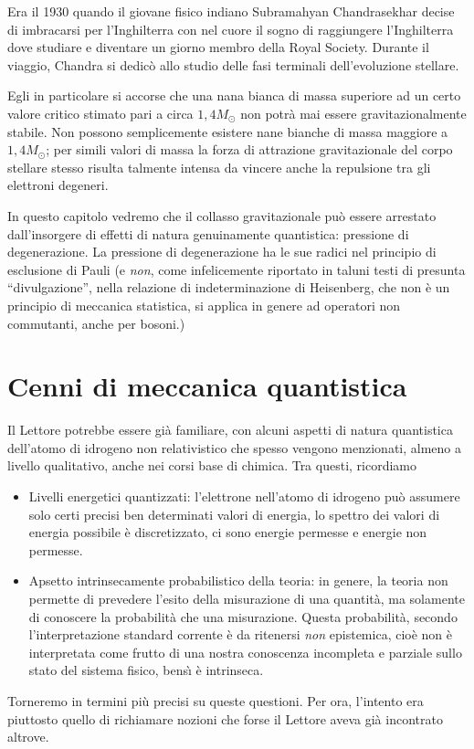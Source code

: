 

\label{chandra}
\minitoc\mtcskip


\noindent Era il 1930 quando il giovane fisico indiano Subramahyan Chandrasekhar decise di
imbracarsi per l'Inghilterra con nel cuore il sogno di raggiungere l'Inghilterra
dove studiare e diventare un giorno membro della Royal Society.  Durante il
viaggio, Chandra si dedic\`o allo studio delle fasi terminali dell'evoluzione
stellare.

Egli in particolare si accorse che una nana bianca di massa superiore ad un
certo valore critico stimato pari a circa $1,4 M_{\odot}$ non potr\`{a} mai
essere gravitazionalmente stabile. Non possono semplicemente esistere nane
bianche di massa maggiore a $1,4 M_{\odot}$; per simili valori di massa la forza
di attrazione gravitazionale del corpo stellare stesso risulta talmente
intensa da vincere anche la repulsione tra gli elettroni degeneri.

In questo capitolo vedremo che il collasso gravitazionale pu\`o essere arrestato
dall'insorgere di effetti di natura genuinamente quantistica: pressione di degenerazione.
La pressione di degenerazione ha le sue radici nel principio di esclusione di
Pauli (e \emph{non}, come infelicemente riportato in taluni testi di presunta
``divulgazione'', nella relazione  di indeterminazione di Heisenberg, che non
\`e un principio di meccanica statistica, si applica in genere ad operatori non
commutanti, anche per bosoni.)


\section{Cenni di meccanica quantistica}

Il Lettore potrebbe essere gi\`a familiare, con alcuni
aspetti di natura quantistica dell'atomo di idrogeno non relativistico che
spesso vengono menzionati, almeno a livello qualitativo, anche nei corsi base
di chimica.
Tra questi, ricordiamo
\begin{itemize}
   \item Livelli energetici quantizzati: l'elettrone nell'atomo di idrogeno
      pu\`o assumere solo certi precisi ben determinati valori di energia,
      lo spettro dei valori di energia possibile \`e discretizzato, ci sono
      energie permesse e energie non permesse.
   \item Apsetto intrinsecamente probabilistico della teoria: in genere, la
      teoria non permette di prevedere l'esito della misurazione di una
      quantit\`a, ma solamente di conoscere la probabilit\`a che una
      misurazione. Questa probabilit\`a, secondo l'interpretazione standard
      corrente \`e da ritenersi \emph{non} epistemica, cio\`e non \`e
      interpretata come frutto di una nostra conoscenza incompleta e parziale
      sullo stato del sistema fisico, bens\`{\i} \`e intrinseca.
\end{itemize}
Torneremo in termini pi\`u precisi su queste questioni. Per ora, l'intento era
piuttosto quello di richiamare nozioni che forse il Lettore aveva gi\`a
incontrato altrove.

